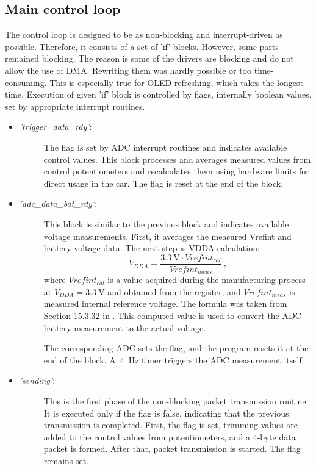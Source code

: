 \subsection{Main control loop}
The control loop is designed to be as non-blocking and interrupt-driven as possible. Therefore, it consists of a set of 'if' blocks. However, some parts remained blocking. The reason is some of the drivers are blocking and do not allow the use of DMA. Rewriting them was hardly possible or too time-consuming. This is especially true for OLED refreshing, which takes the longest time. Execution of given 'if' block is controlled by flags, internally boolean values, set by appropriate interrupt routines.
\newpage
\begin{itemize}
	\item \begin{description}
\item[\textit{'trigger\_data\_rdy'}:]
The flag is set by ADC interrupt routines and indicates available control values. This block processes and averages measured values from control potentiometers and recalculates them using hardware limits for direct usage in the car. The flag is reset at the end of the block.
\end{description}

	\item \begin{description}
\item[\textit{'adc\_data\_bat\_rdy'}:]
This block is similar to the previous block and indicates available voltage measurements.  First, it averages the measured Vrefint and battery voltage data. The next step is VDDA calculation:
\begin{equation}
	V_{DDA} = \frac{\SI{3.3}{\V} \cdot Vrefint_{cal}}{Vrefint_{meas}}\ ,
\end{equation}
where $Vrefint_{cal}$ is a value acquired during the manufacturing process at $V_{DDA} = \SI{3.3}{\V}$ and obtained from the register, and $Vrefint_{meas}$ is measured internal reference voltage. The formula was taken from Section 15.3.32 in \cite{f303_ref}. This computed value is used to convert the ADC battery measurement to the actual voltage.

The corresponding ADC sets the flag, and the program resets it at the end of the block. A~\SI{4}{\Hz} timer triggers the ADC measurement itself.
\end{description}

	\item \begin{description}
\item[\textit{'sending'}:]
This is the first phase of the non-blocking packet transmission routine. It is executed only if the flag is false, indicating that the previous transmission is completed. First, the flag is set, trimming values are added to the control values from potentiometers, and a 4-byte data packet is formed. After that, packet transmission is started. The flag remains set.
\end{description}


\end{itemize}

